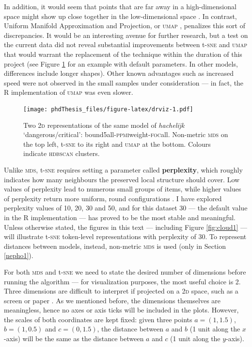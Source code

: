 \documentclass[
]{book}
\begin{document}
In addition, it would seem that points that are far away in a high-dimensional space might show up close together in the low-dimensional space \autocite{oskolkov_2021}.
In contrast, Uniform Manifold Approximation and Projection, or \textsc{umap} \autocite{mcinnes.etal_2020}, penalizes this sort of discrepancies. It would be an interesting avenue for further research, but a test on the current data did not reveal substantial improvements between t-\textsc{sne} and \textsc{umap} that would warrant the replacement of the technique within the duration of this project (see Figure \ref{fig:drviz} for an example with default parameters. In other models, differences include longer shapes). Other known advantages such as increased speed were not observed in the small samples under consideration --- in fact, the R implementation of \textsc{umap} \autocite{R-umap} was even slower.



\begin{figure}
\centering
\texttt{[image: phdThesis\_files/figure-latex/drviz-1.pdf]}
\caption{\label{fig:drviz}Two \textsc{2d} representations of the same model of \emph{hachelijk} `dangerous/critical': bound5all-\textsc{ppmi}weight-\textsc{foc}all. Non-metric \textsc{mds} on the top left, t-\textsc{sne} to its right and \textsc{umap} at the bottom. Colours indicate \textsc{hdbscan} clusters.}
\end{figure}

Unlike \textsc{mds}, t-\textsc{sne} requires setting a parameter called \textbf{perplexity}, which roughly indicates how many neighbours the preserved local structure should cover. Low values of perplexity lead to numerous small groups of items, while higher values of perplexity return more uniform, round configurations \autocite{wattenberg.etal_2016}. I have explored perplexity values of 10, 20, 30 and 50, and for this dataset 30 --- the default value in the R implementation --- has proved to be the most stable and meaningful. Unless otherwise stated, the figures in this text --- including Figure \ref{fig:cloud1} --- will illustrate t-\textsc{sne} token-level representations with perplexity of 30. To represent distances between models, instead, non-metric \textsc{mds} is used (only in Section \ref{nepho1}).

For both \textsc{mds} and t-\textsc{sne} we need to state the desired number of dimensions before running the algorithm --- for visualization purposes, the most useful choice is 2. Three dimensions are difficult to interpret if projected on a \textsc{2d} space, such as a screen or paper \autocite{card.etal_1999,wielfaert.etal_2019}.
As we mentioned before, the dimensions themselves are meaningless, hence no axes or axis ticks will be included in the plots. However, the scales of both coordinates are kept fixed: given three points \(a=(1, 1.5)\), \(b=(1, 0.5)\) and \(c=(0, 1.5)\), the distance between \(a\) and \(b\) (1 unit along the \(x\)-axis) will be the same as the distance between \(a\) and \(c\) (1 unit along the \(y\)-axis).
\end{document}
